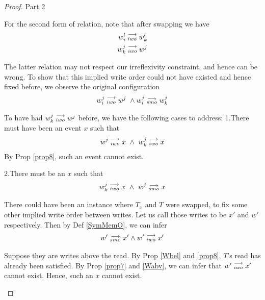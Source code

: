\begin{proof}{Part 2}
\begin{itemize}
                        For the second form of relation, note that after swapping we have 
                        \begin{align*}
                            w_i^l\stackrel{\longrightarrow}{_{iwo}}w_k^l \\ 
                            w_k^j\stackrel{\longrightarrow}{_{iwo}}w^j    
                        \end{align*}

                        The latter relation may not respect our irreflexivity constraint, and hence can be wrong. To show that this implied write order could not have existed and hence fixed before, we observe the original configuration
                        \begin{align*}
                            w_i^j\stackrel{\longrightarrow}{_{iwo}}w^j \ \wedge w_i^j\stackrel{\longrightarrow}{_{smo}}w_k^j
                        \end{align*}


                        To have had $w_k^j\stackrel{\longrightarrow}{_{iwo}}w^j$ before, we have the following cases to address:
                        1.There must have been an event $x$ such that 
                        \begin{align*}
                            \reln{w^j}{iwo}{x} \ \wedge \ \reln{w_k^j}{iwo}{x}                            
                        \end{align*} 
                        By Prop \ref{prop8}, such an event cannot exist. 
                        
                        2.There must be an $x$ such that 
                        \begin{align*}
                            \reln{w_k^j}{iwo}{x} \ \wedge \ \reln{w^j}{smo}{x}
                        \end{align*}

                        There could have been an instance where $T_x$ and $T$ were swapped, to fix some other implied write order between writes. 
                        Let us call those writes to be $x'$ and $w'$ respectively.
                        Then by Def \ref{SymMemO}, we can infer 
                        \begin{align*}
                            w'\stackrel{\longrightarrow}{_{smo}}x' \wedge w'\stackrel{\longrightarrow}{_{iwo}}x'
                        \end{align*}
                        
                        Suppose they are writes above the read.                         
                        By Prop \ref{Wbel} and \ref{prop8}, $T$'s read has already been satisfied. By Prop \ref{prop7} and \ref{Wabv}, we can infer that $w'\stackrel{\longrightarrow}{_{iwo}}x'$ cannot exist. Hence, such an $x$ cannot exist. 
                        

\end{itemize}
\end{proof}
